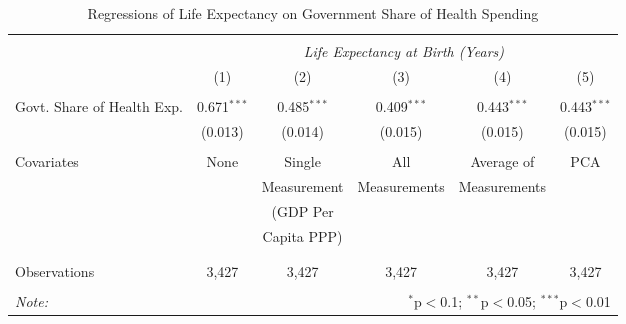 \begin{table}[!htbp] \centering
  \caption{Regressions of Life Expectancy on Government Share of Health Spending \label{main_regs}}
\begin{tabular}{@{\extracolsep{5pt}}lccccc}
\\[-1.8ex]\hline
\hline \\[-1.8ex]
& \multicolumn{5}{c}{\textit{Life Expectancy at Birth (Years)}} \
\cr \
\\[-1.8ex] & (1) & (2) & (3) & (4) & (5) \\
\hline \\[-1.8ex]
 Govt. Share of Health Exp. & 0.671$^{***}$ & 0.485$^{***}$ & 0.409$^{***}$ & 0.443$^{***}$ & 0.443$^{***}$ \\
  & (0.013) & (0.014) & (0.015) & (0.015) & (0.015) \\
  &  &  &  &  &  \\
 Covariates & None & Single & All & Average of & PCA \\
  &  & Measurement & Measurements & Measurements &  \\
  &  & (GDP Per &  &  &  \\
  &  & Capita PPP) &  &  &  \\
  &  &  &  &  &  \\
\hline \\[-1.8ex]
 Observations & 3,427 & 3,427 & 3,427 & 3,427 & 3,427 \\
\hline
\hline \\[-1.8ex]
\textit{Note:} & \multicolumn{5}{r}{$^{*}$p$<$0.1; $^{**}$p$<$0.05; $^{***}$p$<$0.01} \\
\end{tabular}
\end{table}